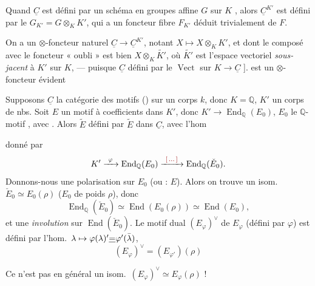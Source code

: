 \documentclass[11pt,a4paper]{article}
\begin{document}
Quand $\underline{C}$ est défini par un schéma en groupes affine $G$ sur $K$
, alors
$\underline{C}^{K'}$ est défini par le  \struck{\ill{}}
$G_{K'} = G \otimes_{K} K'$, qui a un
foncteur fibre $F_{K'}$ déduit trivialement de $F$.

On a un $\otimes$-foncteur naturel
$\underline{C} \to \underline{C}^{K'}$, notant $X \mapsto X \otimes_{K} K'$, et
dont le composé avec le foncteur « oubli » est bien
$X \otimes_{K} \widetilde{K'}$, où $\widetilde{K'}$ est \struck{\ill{}}
l'espace vectoriel \emph{sous-jacent} à $K'$ sur $K$, --- puisque
\ill{} $\underline{C}$ défini par le \ill{}
$\operatorname{Vect}$  sur $K \to \underline{C}$ ]. \ill{}
est un $\otimes$-foncteur évident \ill{}

Supposons $\underline{C}$ la catégorie des motifs 
 (\ill{}) sur un corps $k$, donc
$K = \mathbb{Q}$, $K'$ un corps de nbs. Soit $E$ un motif à coefficients dans
$K'$, donc \ill{} $K' \to \operatorname{End}_{\mathbb{Q}}(E_{0})$, $E_{0}$ le
$\mathbb{Q}$-motif \ill{}, avec 
\ill{}. Alors $\widetilde{E}$  défini par $\widetilde{E}$ dans
$\underline{C}$, avec l'hom


donné par
\[ K' \xrightarrow{\ \varphi\ } \operatorname{End}_{\mathbb{Q}}(E_{0})
   \xrightarrow{\ \ill{}\ }
   \operatorname{End}_{\mathbb{Q}}(\check{E}_{0}) . \]
Donnons-nous une polarisation sur $E_{0}$ (ou \ill{} \struck{\ill{}} : $E$).
Alors on trouve un isom.\ $\check{E}_{0} \simeq E_{0}(\rho)$ ($E_{0}$ de poids
$\rho$), donc
\[ \operatorname{End}_{\mathbb{Q}}(\check{E}_{0})
   \simeq \operatorname{End}(E_{0}(\rho)) \simeq \operatorname{End}(E_{0}) , \]
et \ill{} \ill{} une \emph{involution} \add{\ill{}} sur
$\operatorname{End}(\check{E}_{0})$. Le motif dual $(E_{\varphi})^{\vee}$ de
$E_{\varphi}$ (défini par $\varphi$) est défini par l'hom.\
$\lambda \mapsto \varphi(\lambda)' \uncertain{=} \varphi'(\bar{\lambda})$,
\ill{}
\[ \boxed{\ (E_{\varphi})^{\vee} = (E_{\varphi'})(\rho) \ } \]

Ce n'est pas en général un isom.\
$(E_{\varphi})^{\vee} \simeq E_{\varphi}(\rho)$ !
\end{document}
